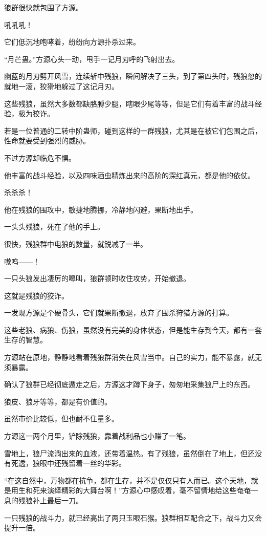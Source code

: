 \begin{this_body}
狼群很快就包围了方源。

吼吼吼！

它们低沉地咆哮着，纷纷向方源扑杀过来。

“月芒蛊。”方源心头一动，甩手一记月刃呼的飞射出去。

幽蓝的月刃劈开风雪，连续斩中残狼，瞬间解决了三头，到了第四头时，残狼忽的就地一滚，狡猾地躲过了这记月刃。

这些残狼，虽然大多数都缺胳膊少腿，瞎眼少尾等等，但是它们有着丰富的战斗经验，极为狡诈。

若是一位普通的二转中阶蛊师，碰到这样的一群残狼，尤其是在被它们包围之后，性命就要受到强烈的威胁。

不过方源却临危不惧。

他丰富的战斗经验，以及四味酒虫精炼出来的高阶的深红真元，都是他的依仗。

杀杀杀！

他在残狼的围攻中，敏捷地腾挪，冷静地闪避，果断地出手。

一头头残狼，死在了他的手上。

很快，残狼群中电狼的数量，就锐减了一半。

嗷呜——！

一只头狼发出凄厉的嗥叫，狼群顿时收住攻势，开始撤退。

这就是残狼的狡诈。

一发现方源是个硬骨头，它们就果断撤退，放弃了围杀狩猎方源的打算。

这些老狼、病狼、伤狼，虽然没有完美的身体状态，但是能生存到今天，都有一套生存的智慧。

方源站在原地，静静地看着残狼群消失在风雪当中。自己的实力，能不暴露，就无须暴露。

确认了狼群已经彻底遁走之后，方源这才蹲下身子，匆匆地采集狼尸上的东西。

狼皮、狼牙等等，都是有价值的。

虽然市价比较低，但也耐不住量多。

方源这一两个月里，铲除残狼，靠着战利品也小赚了一笔。

雪地上，狼尸流淌出来的血液，还带着温热。有了残狼，虽然倒在了地上，但还没有死透，狼眼中还残留着一丝的华彩。

“在这自然中，万物都在抗争，都在生存，并不是仅仅只有人而已。这个天地，就是用生和死来演绎精彩的大舞台啊！”方源心中感叹着，毫不留情地给这些奄奄一息的残狼补上最后一刀。

一只残狼的战斗力，就已经高出了两只玉眼石猴。狼群相互配合之下，战斗力又会提升一倍。


\end{this_body}
